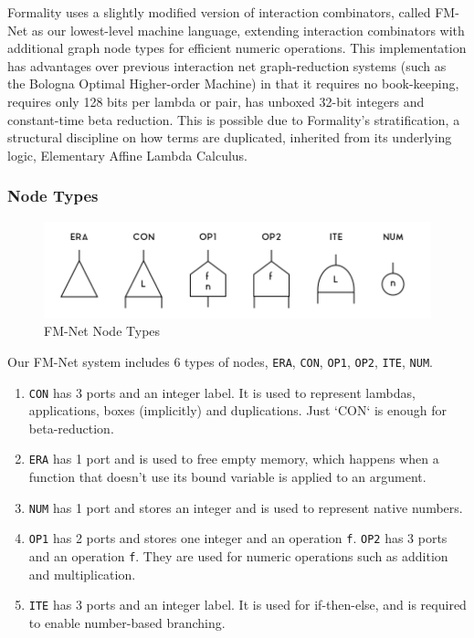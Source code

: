 \documentclass{article}
\theoremstyle{definition}
\theoremstyle{theorem}
\begin{document}
Formality uses a slightly modified version of interaction combinators, called
FM-Net as our lowest-level machine language, extending interaction combinators
with additional graph node types for efficient numeric operations. This
implementation has advantages over previous interaction net graph-reduction
systems (such as the Bologna Optimal Higher-order Machine) in that it requires
no book-keeping, requires only 128 bits per lambda or pair, has unboxed 32-bit
integers and constant-time beta reduction. This is possible due to Formality's
stratification, a structural discipline on how terms are duplicated, inherited
from its underlying logic, Elementary Affine Lambda Calculus.

\subsubsection{Node Types}

\begin{figure}[H]
  \includegraphics[width=\linewidth]{fm-net-node-types.png}
  \caption{FM-Net Node Types}
\end{figure}

Our FM-Net system includes 6 types of nodes, \verb|ERA|, \verb|CON|, \verb|OP1|,
\verb|OP2|, \verb|ITE|, \verb|NUM|.

\begin{enumerate}
\item \verb|CON| has 3 ports and an integer label. It is used to represent lambdas,
  applications, boxes (implicitly) and duplications. Just `CON` is enough for
  beta-reduction.

\item \verb|ERA| has 1 port and is used to free empty memory, which happens when a
  function that doesn't use its bound variable is applied to an argument.

\item \verb|NUM| has 1 port and stores an integer and is used to represent native
  numbers.

\item \verb|OP1| has 2 ports and stores one integer and an operation \verb|f|.
\verb|OP2| has 3 ports and an operation \verb|f|. They are used for numeric
operations such as addition and multiplication.

\item \verb|ITE| has 3 ports and an integer label. It is used for if-then-else,
and is required to enable number-based branching.  
\end{enumerate}
\end{document}
